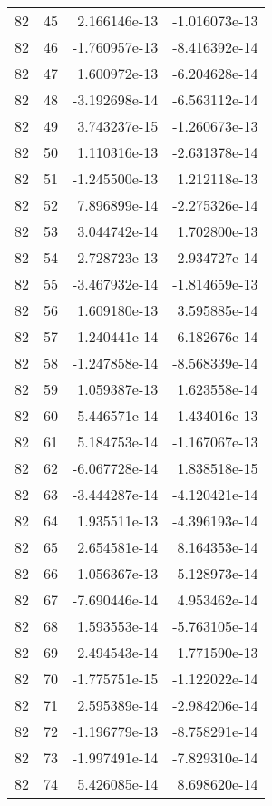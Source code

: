 \begin{tabular}{rrrr}
  82 &   45 &  2.166146e-13 & -1.016073e-13 \\
  82 &   46 & -1.760957e-13 & -8.416392e-14 \\
  82 &   47 &  1.600972e-13 & -6.204628e-14 \\
  82 &   48 & -3.192698e-14 & -6.563112e-14 \\
  82 &   49 &  3.743237e-15 & -1.260673e-13 \\
  82 &   50 &  1.110316e-13 & -2.631378e-14 \\
  82 &   51 & -1.245500e-13 &  1.212118e-13 \\
  82 &   52 &  7.896899e-14 & -2.275326e-14 \\
  82 &   53 &  3.044742e-14 &  1.702800e-13 \\
  82 &   54 & -2.728723e-13 & -2.934727e-14 \\
  82 &   55 & -3.467932e-14 & -1.814659e-13 \\
  82 &   56 &  1.609180e-13 &  3.595885e-14 \\
  82 &   57 &  1.240441e-14 & -6.182676e-14 \\
  82 &   58 & -1.247858e-14 & -8.568339e-14 \\
  82 &   59 &  1.059387e-13 &  1.623558e-14 \\
  82 &   60 & -5.446571e-14 & -1.434016e-13 \\
  82 &   61 &  5.184753e-14 & -1.167067e-13 \\
  82 &   62 & -6.067728e-14 &  1.838518e-15 \\
  82 &   63 & -3.444287e-14 & -4.120421e-14 \\
  82 &   64 &  1.935511e-13 & -4.396193e-14 \\
  82 &   65 &  2.654581e-14 &  8.164353e-14 \\
  82 &   66 &  1.056367e-13 &  5.128973e-14 \\
  82 &   67 & -7.690446e-14 &  4.953462e-14 \\
  82 &   68 &  1.593553e-14 & -5.763105e-14 \\
  82 &   69 &  2.494543e-14 &  1.771590e-13 \\
  82 &   70 & -1.775751e-15 & -1.122022e-14 \\
  82 &   71 &  2.595389e-14 & -2.984206e-14 \\
  82 &   72 & -1.196779e-13 & -8.758291e-14 \\
  82 &   73 & -1.997491e-14 & -7.829310e-14 \\
  82 &   74 &  5.426085e-14 &  8.698620e-14 \\

\end{tabular}
